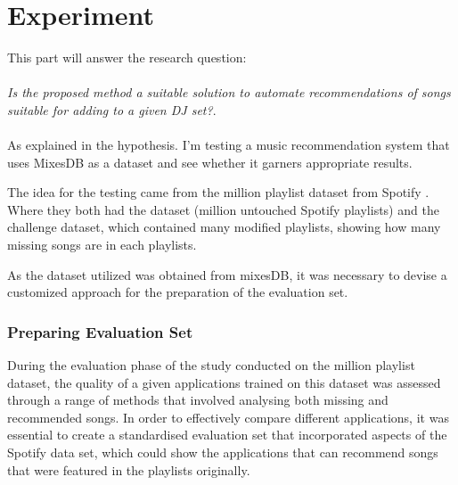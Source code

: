 
\graphicspath{{Chapter5/}}


\chapter{Experiment}


This part will answer the research question: 
\\
\\
\textit{Is the proposed method a suitable solution to automate recommendations of songs suitable for adding to a given DJ set?}.
\\
\\
As explained in the hypothesis. I'm testing a music recommendation system that uses MixesDB as a dataset and see whether it garners appropriate results.

The idea for the testing came from the million playlist dataset from Spotify \citep{aicrowd_aicrowd_2023}.  Where they both had the dataset (million untouched Spotify playlists) and the challenge dataset, which contained many modified playlists, showing how many missing songs are in each playlists.

As the dataset utilized was obtained from mixesDB, it was necessary to devise a customized approach for the preparation of the evaluation set.

\subsection{Preparing Evaluation Set}
During the evaluation phase of the study conducted on the million playlist dataset, the quality of a given applications trained on this dataset was assessed through a range of methods that involved analysing both missing and recommended songs. In order to effectively compare different applications, it was essential to create a standardised evaluation set that incorporated aspects of the Spotify data set, which could show the applications that can recommend songs that were featured in the playlists originally.


